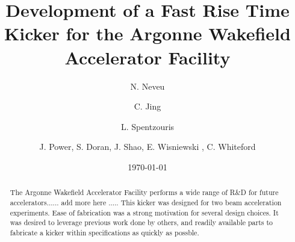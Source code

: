 \documentclass[aps,prab,preprint,groupedaddress,linenumbers]{revtex4-2}
\begin{document}

\title{Development of a Fast Rise Time Kicker for the Argonne Wakefield Accelerator Facility}

\author{N. Neveu}

\author{C. Jing}

\author{L. Spentzouris}



\author{J. Power, S. Doran, J. Shao, E. Wisniewski , C. Whiteford}


\date{\today}

\begin{abstract}
The Argonne Wakefield Accelerator Facility performs a wide range of R\&D for 
future accelerators...... add more here .....
This kicker was designed for two beam acceleration experiments.
Ease of fabrication was a strong motivation for several design choices.
It was desired to leverage previous work done by others, and readily available parts
to fabricate a kicker within specifications as quickly as possble.
\end{abstract}


\maketitle
\end{document}
